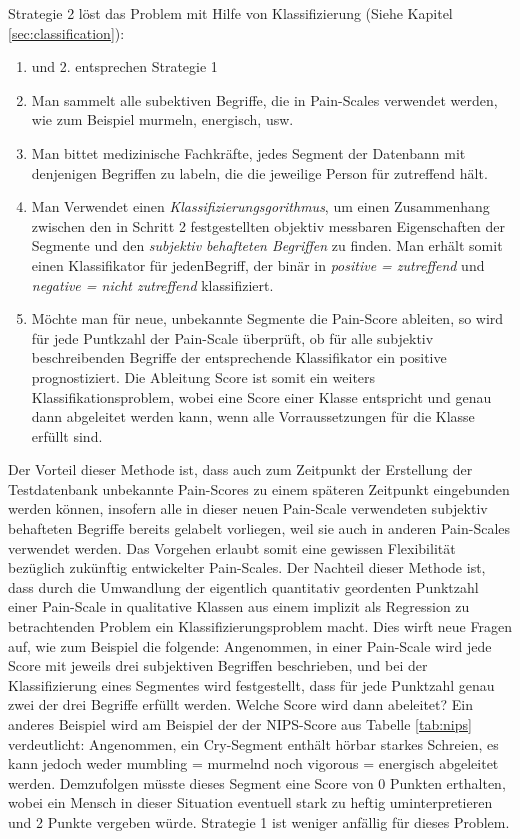 Strategie 2 löst das Problem mit Hilfe von Klassifizierung (Siehe Kapitel \ref{sec:classification}):
\begin{enumerate}
	\item und 2. entsprechen Strategie 1
	\item Man sammelt alle subektiven Begriffe, die in Pain-Scales verwendet werden, wie zum Beispiel \glqq murmeln\grqq , \glqq energisch\grqq , usw.
	\item Man bittet medizinische Fachkräfte, jedes Segment der Datenbann mit denjenigen Begriffen zu labeln, die die jeweilige Person für zutreffend hält. 
	\item  Man Verwendet einen \emph{Klassifizierungsgorithmus}, um einen Zusammenhang zwischen den in Schritt 2 festgestellten objektiv messbaren Eigenschaften der Segmente und den \emph{subjektiv behafteten Begriffen} zu finden. Man erhält somit einen Klassifikator für jedenBegriff, der binär in \emph{positive = zutreffend} und \emph{negative = nicht zutreffend} klassifiziert.
	\item Möchte man für neue, unbekannte Segmente die Pain-Score ableiten, so wird für jede Puntkzahl der Pain-Scale überprüft, ob für alle subjektiv beschreibenden Begriffe der entsprechende Klassifikator ein positive prognostiziert. Die Ableitung Score ist somit ein weiters Klassifikationsproblem, wobei eine Score einer Klasse entspricht und genau dann abgeleitet werden kann, wenn alle Vorraussetzungen für die Klasse erfüllt sind.
\end{enumerate}

Der Vorteil dieser Methode ist, dass auch zum Zeitpunkt der Erstellung der Testdatenbank unbekannte Pain-Scores zu einem späteren Zeitpunkt eingebunden werden können, insofern alle in dieser neuen Pain-Scale verwendeten subjektiv behafteten Begriffe bereits gelabelt vorliegen, weil sie auch in anderen Pain-Scales verwendet werden. Das Vorgehen erlaubt somit eine gewissen Flexibilität bezüglich zukünftig entwickelter Pain-Scales. Der Nachteil dieser Methode ist, dass durch die Umwandlung der eigentlich quantitativ geordenten Punktzahl einer Pain-Scale in qualitative Klassen aus einem implizit als Regression zu betrachtenden Problem ein Klassifizierungsproblem macht. Dies wirft neue Fragen auf, wie zum Beispiel die folgende: Angenommen, in einer Pain-Scale wird jede Score mit jeweils drei subjektiven Begriffen beschrieben, und bei der Klassifizierung eines Segmentes wird festgestellt, dass für jede Punktzahl genau zwei der drei Begriffe erfüllt werden. Welche Score wird dann abeleitet? Ein anderes Beispiel wird am Beispiel der der NIPS-Score aus Tabelle \ref{tab:nips} verdeutlicht: Angenommen, ein Cry-Segment enthält hörbar \glqq starkes\grqq{} Schreien, es kann jedoch weder \glqq mumbling = murmelnd \grqq{} noch \glqq vigorous = energisch\grqq{} abgeleitet werden. Demzufolgen müsste dieses Segment eine Score von 0 Punkten erthalten, wobei ein Mensch in dieser Situation eventuell \glqq stark\grqq{} zu \glqq heftig\grqq{} uminterpretieren und 2 Punkte vergeben würde.  Strategie 1 ist weniger anfällig für dieses Problem.

